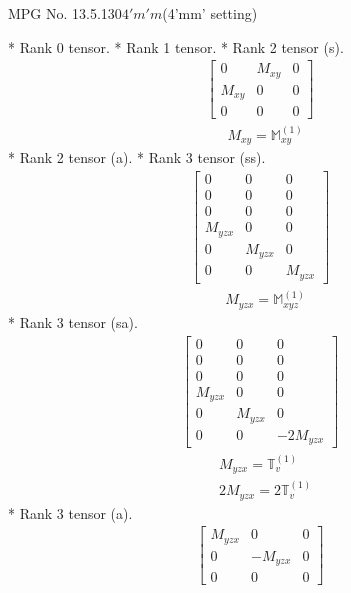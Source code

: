 \documentclass[fleqn,8pt,landscape]{jsarticle}
\begin{document}
\setcounter{MaxMatrixCols}{32}

\renewcommand{\tablename}{Table~}
\renewcommand{\figurename}{Figure~}
\begin{center}
\LARGE
MPG No. 13.5.130\quad$4'm'm$\quad(4'mm' setting)
\end{center}
* Rank 0 tensor.
* Rank 1 tensor.
* Rank 2 tensor (s).
\begin{align*}
\begin{bmatrix} 0 & M_{xy} & 0 \\ M_{xy} & 0 & 0 \\ 0 & 0 & 0 \end{bmatrix}
\end{align*}
\begin{align*}
& M_{xy} = \mathbb{M}_{xy}^{(1)}
\end{align*}
* Rank 2 tensor (a).
* Rank 3 tensor (ss).
\begin{align*}
\begin{bmatrix} 0 & 0 & 0 \\ 0 & 0 & 0 \\ 0 & 0 & 0 \\ M_{yzx} & 0 & 0 \\ 0 & M_{yzx} & 0 \\ 0 & 0 & M_{yzx} \end{bmatrix}
\end{align*}
\begin{align*}
& M_{yzx} = \mathbb{M}_{xyz}^{(1)}
\end{align*}
* Rank 3 tensor (sa).
\begin{align*}
\begin{bmatrix} 0 & 0 & 0 \\ 0 & 0 & 0 \\ 0 & 0 & 0 \\ M_{yzx} & 0 & 0 \\ 0 & M_{yzx} & 0 \\ 0 & 0 & - 2 M_{yzx} \end{bmatrix}
\end{align*}
\begin{align*}
& M_{yzx} = \mathbb{T}_{v}^{(1)} \\
& 2 M_{yzx} = 2 \mathbb{T}_{v}^{(1)}
\end{align*}
* Rank 3 tensor (a).
\begin{align*}
\begin{bmatrix} M_{yzx} & 0 & 0 \\ 0 & - M_{yzx} & 0 \\ 0 & 0 & 0 \end{bmatrix}
\end{align*}
\end{document}
